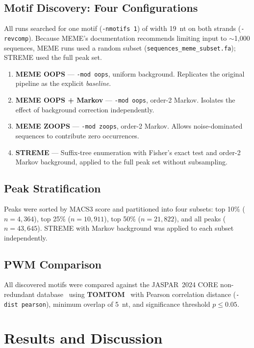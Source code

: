 \documentclass[12pt]{article}
\begin{document}
\subsection{Motif Discovery: Four Configurations}

All runs searched for one motif (\texttt{-nmotifs~1}) of width 19~nt on both
strands (\texttt{-revcomp}). Because MEME's documentation recommends limiting
input to $\sim$1,000 sequences, MEME runs used a random subset
(\texttt{sequences\_meme\_subset.fa}); STREME used the full peak set.

\begin{enumerate}
    \item \textbf{MEME OOPS} --- \texttt{-mod oops}, uniform background.
          Replicates the original pipeline as the explicit \emph{baseline}.
    \item \textbf{MEME OOPS + Markov} --- \texttt{-mod oops}, order-2 Markov.
          Isolates the effect of background correction independently.
    \item \textbf{MEME ZOOPS} --- \texttt{-mod zoops}, order-2 Markov.
          Allows noise-dominated sequences to contribute zero occurrences.
    \item \textbf{STREME} --- Suffix-tree enumeration with Fisher's exact test
          and order-2 Markov background, applied to the full peak set
          without subsampling.
\end{enumerate}

\subsection{Peak Stratification}

Peaks were sorted by MACS3 score and partitioned into four subsets: top 10\%
($n = 4{,}364$), top 25\% ($n = 10{,}911$), top 50\% ($n = 21{,}822$),
and all peaks ($n = 43{,}645$). STREME with Markov background was applied to
each subset independently.

\subsection{PWM Comparison}

All discovered motifs were compared against the JASPAR~2024 CORE
non-redundant database~\cite{jaspar2024} using \textbf{TOMTOM}~\cite{gupta2007}
with Pearson correlation distance (\texttt{-dist~pearson}), minimum overlap
of 5~nt, and significance threshold $p \leq 0.05$.

\section{Results and Discussion}
\end{document}
